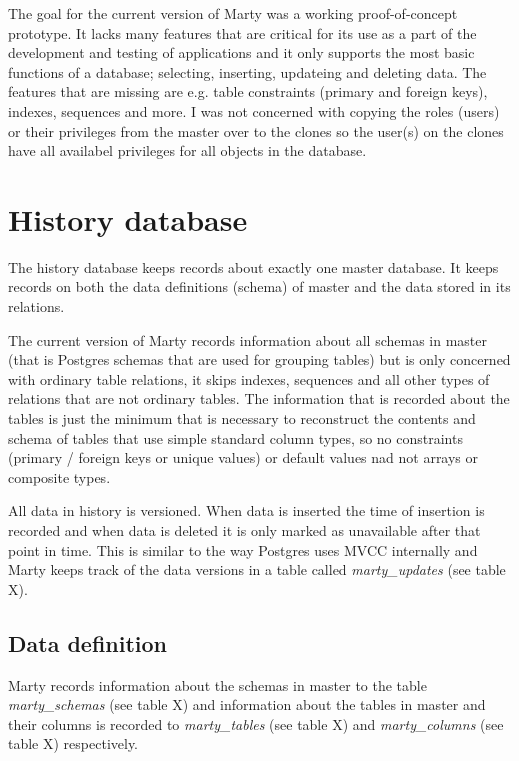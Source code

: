 \documentclass[a4paper,12pt,twoside,BCOR=10mm]{scrbook}
\begin{document}

The goal for the current version of Marty was a working proof-of-concept prototype. It lacks many features that are critical for its use as a part of the development and testing of applications and it only supports the most basic functions of a database; selecting, inserting, updateing and deleting data. The features that are missing are e.g. table constraints (primary and foreign keys), indexes, sequences and more. I was not concerned with copying the roles (users) or their privileges from the master over to the clones so the user(s) on the clones have all availabel privileges for all objects in the database.

\section{History database}
The history database keeps records about exactly one master database. It keeps records on both the data definitions (schema) of master and the data stored in its relations.

The current version of Marty records information about all schemas in master (that is Postgres schemas that are used for grouping tables) but is only concerned with ordinary table relations, it skips indexes, sequences and all other types of relations that are not ordinary tables. The information that is recorded about the tables is just the minimum that is necessary to reconstruct the contents and schema of tables that use simple standard column types, so no constraints (primary / foreign keys or unique values) or default values nad not arrays or composite types.

All data in history is versioned. When data is inserted the time of insertion is recorded and when data is deleted it is only marked as unavailable after that point in time. This is similar to the way Postgres uses MVCC internally and Marty keeps track of the data versions in a table called \textit{marty\_updates} (see table X).


\subsection{Data definition}
Marty records information about the schemas in master to the table \textit{marty\_schemas} (see table X) and information about the tables in master and their columns is recorded to \textit{marty\_tables} (see table X) and \textit{marty\_columns} (see table X) respectively.
\end{document}
